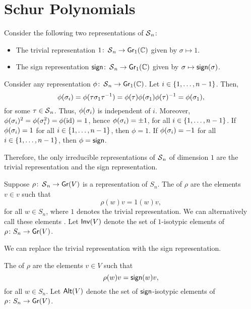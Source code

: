 \chapter{Schur Polynomials}

Consider the following two representations of \(\operatorname{\mathcal{S}}_n\):
\begin{itemize}
    \item The trivial representation \(1 \colon \operatorname{\mathcal{S}}_n \to \operatorname{\mathsf{Gr}}_1(\mathbb{C})\) given by \(\sigma \mapsto 1\).
    \item The sign representation \(\operatorname{\mathsf{sign}} \colon \operatorname{\mathcal{S}}_n \to \operatorname{\mathsf{Gr}}_1(\mathbb{C})\) given by \(\sigma \mapsto \operatorname{\mathsf{sign}}(\sigma)\).
\end{itemize}

Consider any representation \(\phi \colon  \operatorname{\mathcal{S}}_n \to \operatorname{\mathsf{Gr}}_1(\mathbb{C})\).
Let \(i \in \interval{n-1}\).
Then,
\begin{equation}
    \phi(\sigma_{i}) = \phi(\tau \sigma_{1} \tau^{-1}) = \phi(\tau) \phi(\sigma_{1}) \phi(\tau)^{-1} = \phi(\sigma_{1}),
\end{equation}
for some \(\tau \in \operatorname{\mathcal{S}}_n\).
Thus, \(\phi(\sigma_{i})\) is independent of \(i\).
Moreover, \(\phi(\sigma_{i})^2 = \phi(\sigma_{i}^2) = \phi(\operatorname{id}) = 1\), hence \(\phi(\sigma_{i}) = \pm 1\), for all \(i \in \interval{n-1}\).
If \(\phi(\sigma_{i}) = 1\) for all \(i \in \interval{n-1}\), then \(\phi = 1\).
If \(\phi(\sigma_{i}) = -1\) for all \(i \in \interval{n-1}\), then \(\phi = \operatorname{\mathsf{sign}}\).

Therefore, the only irreducible representations of \(\operatorname{\mathcal{S}}_n\) of dimension \(1\) are the trivial representation and the sign representation.

Suppose \(\rho \colon \operatorname{\mathcal{S}}_n \to \operatorname{\mathsf{Gr}}(V)\) is a representation of \(S_n\).
The  of \(\rho\) are the elements \(v \in v\) such that
\begin{equation}
    \rho(w) v = 1(w) v, 
\end{equation}
for all \(w \in S_n\), where \(1\) denotes the trivial representation.
We can alternatively call these elements .
Let \(\operatorname{\mathsf{Inv}}(V)\) denote the set of \(1\)-isotypic elements of \(\rho \colon S_n \to \operatorname{\mathsf{Gr}}(V)\).

We can replace the trivial representation with the sign representation.

The  of \(\rho\) are the elements \(v \in V\) such that
\begin{equation}
    \rho(w) v = \operatorname{\mathsf{sign}}(w) v,
\end{equation}
for all \(w \in S_n\).
Let \(\operatorname{\mathsf{Alt}}(V)\) denote the set of \(\operatorname{\mathsf{sign}}\)-isotypic elements of \(\rho \colon S_n \to \operatorname{\mathsf{Gr}}(V)\).

